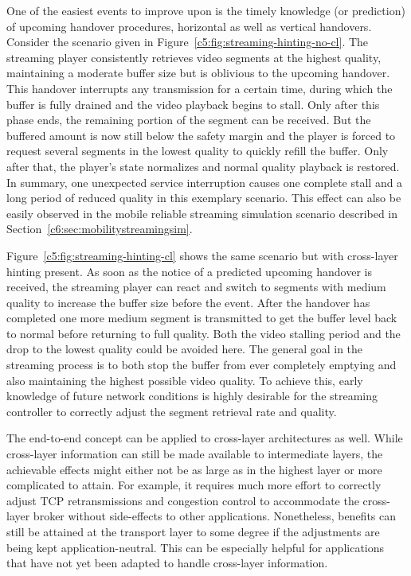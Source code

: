 One of the easiest events to improve upon is the timely knowledge (or prediction) of upcoming handover procedures, horizontal as well as vertical handovers. Consider the scenario given in Figure~\ref{c5:fig:streaming-hinting-no-cl}. The streaming player consistently retrieves video segments at the highest quality, maintaining a moderate buffer size but is oblivious to the upcoming handover. This handover interrupts any transmission for a certain time, during which the buffer is fully drained and the video playback begins to stall. Only after this phase ends, the remaining portion of the segment can be received. But the buffered amount is now still below the safety margin and the player is forced to request several segments in the lowest quality to quickly refill the buffer. Only after that, the player's state normalizes and normal quality playback is restored. In summary, one unexpected service interruption causes one complete stall and a long period of reduced quality in this exemplary scenario. This effect can also be easily observed in the mobile reliable streaming simulation scenario described in Section~\ref{c6:sec:mobilitystreamingsim}.

Figure~\ref{c5:fig:streaming-hinting-cl} shows the same scenario but with cross-layer hinting present. As soon as the notice of a predicted upcoming handover is received, the streaming player can react and switch to segments with medium quality to increase the buffer size before the event. After the handover has completed one more medium segment is transmitted to get the buffer level back to normal before returning to full quality. Both the video stalling period and the drop to the lowest quality could be avoided here. The general goal in the streaming process is to both stop the buffer from ever completely emptying and also maintaining the highest possible video quality. To achieve this, early knowledge of future network conditions is highly desirable for the streaming controller to correctly adjust the segment retrieval rate and quality.

The end-to-end concept can be applied to cross-layer architectures as well. While cross-layer information can still be made available to intermediate layers, the achievable effects might either not be as large as in the highest layer or more complicated to attain. For example, it requires much more effort to correctly adjust \gls{TCP} retransmissions and congestion control to accommodate the cross-layer broker without side-effects to other applications. Nonetheless, benefits can still be attained at the transport layer to some degree if the adjustments are being kept application-neutral. This can be especially helpful for applications that have not yet been adapted to handle cross-layer information.


